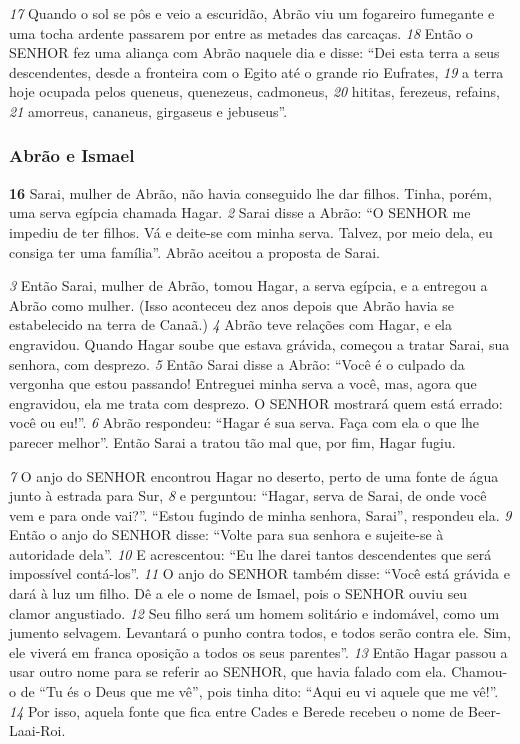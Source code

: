 \bigskip
\textit{\tiny 17}
Quando o sol se pôs e veio a escuridão, Abrão viu um fogareiro fumegante e
uma tocha ardente passarem por entre as metades das carcaças. 
\textit{\tiny 18}
Então o SENHOR
fez uma aliança com Abrão naquele dia e disse: “Dei esta terra a seus
descendentes, desde a fronteira com o Egito até o grande rio Eufrates, 
\textit{\tiny 19}
a terra
hoje ocupada pelos queneus, quenezeus, cadmoneus, 
\textit{\tiny 20}
hititas, ferezeus, refains,
\textit{\tiny 21}
amorreus, cananeus, girgaseus e jebuseus”.

\bigskip
\subsubsection*{Abrão e Ismael}
\textbf{\large 16}
 Sarai, mulher de Abrão, não havia conseguido lhe dar filhos. Tinha, porém,
uma serva egípcia chamada Hagar. 
\textit{\tiny 2}
Sarai disse a Abrão: “O SENHOR me impediu de
ter filhos. Vá e deite-se com minha serva. Talvez, por meio dela, eu consiga ter
uma família”. Abrão aceitou a proposta de Sarai. 

\bigskip
\textit{\tiny 3}
Então Sarai, mulher de Abrão,
tomou Hagar, a serva egípcia, e a entregou a Abrão como mulher. (Isso aconteceu
dez anos depois que Abrão havia se estabelecido na terra de Canaã.)
\textit{\tiny 4}
Abrão teve relações com Hagar, e ela engravidou. Quando Hagar soube que
estava grávida, começou a tratar Sarai, sua senhora, com desprezo. 
\textit{\tiny 5}
Então Sarai
disse a Abrão: “Você é o culpado da vergonha que estou passando! Entreguei
minha serva a você, mas, agora que engravidou, ela me trata com desprezo. O
SENHOR mostrará quem está errado: você ou eu!”.
\textit{\tiny 6}
Abrão respondeu: “Hagar é sua serva. Faça com ela o que lhe parecer melhor”.
Então Sarai a tratou tão mal que, por fim, Hagar fugiu.

\bigskip
\textit{\tiny 7}
O anjo do SENHOR encontrou Hagar no deserto, perto de uma fonte de água
junto à estrada para Sur, 
\textit{\tiny 8}
e perguntou: “Hagar, serva de Sarai, de onde você vem e
para onde vai?”.
   “Estou fugindo de minha senhora, Sarai”, respondeu ela.
\textit{\tiny 9}
Então o anjo do SENHOR disse: “Volte para sua senhora e sujeite-se à autoridade
dela”. 
\textit{\tiny 10}
E acrescentou: “Eu lhe darei tantos descendentes que será impossível contá-los”.
\textit{\tiny 11}
O anjo do SENHOR também disse: “Você está grávida e dará à luz um filho. Dê
a ele o nome de Ismael, pois o SENHOR ouviu seu clamor angustiado. 
\textit{\tiny 12}
Seu filho
será um homem solitário e indomável, como um jumento selvagem. Levantará o
punho contra todos, e todos serão contra ele. Sim, ele viverá em franca oposição a
todos os seus parentes”.   
\textit{\tiny 13}
Então Hagar passou a usar outro nome para se referir ao SENHOR, que havia
falado com ela. Chamou-o de “Tu és o Deus que me vê”, pois tinha dito: “Aqui eu
vi aquele que me vê!”. 
\textit{\tiny 14}
Por isso, aquela fonte que fica entre Cades e Berede
recebeu o nome de Beer-Laai-Roi.   

